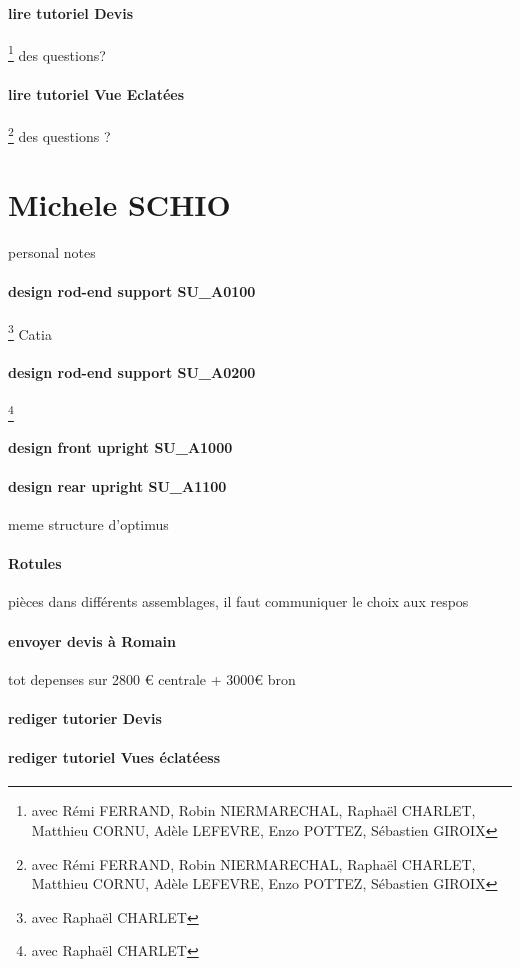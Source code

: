 \paragraph{lire tutoriel Devis} \footnote{avec Rémi FERRAND, Robin NIERMARECHAL, Raphaël CHARLET, Matthieu CORNU, Adèle LEFEVRE, Enzo POTTEZ, Sébastien GIROIX} des questions?
\paragraph{lire tutoriel Vue Eclatées} \footnote{avec Rémi FERRAND, Robin NIERMARECHAL, Raphaël CHARLET, Matthieu CORNU, Adèle LEFEVRE, Enzo POTTEZ, Sébastien GIROIX} des questions ?
\newpage \section*{Michele SCHIO} 
 \par personal notes
\paragraph{design rod-end support SU\_A0100} \footnote{avec Raphaël CHARLET} Catia

\paragraph{design rod-end support SU\_A0200} \footnote{avec Raphaël CHARLET} 
\paragraph{design front upright SU\_A1000} 
\paragraph{design rear upright SU\_A1100} meme structure d'optimus

\paragraph{Rotules} pièces dans différents assemblages, il faut communiquer le choix aux respos
\paragraph{envoyer devis à Romain} tot depenses sur 2800 € centrale + 3000€ bron
\paragraph{rediger tutorier Devis} 
\paragraph{rediger tutoriel Vues éclatéess} 
